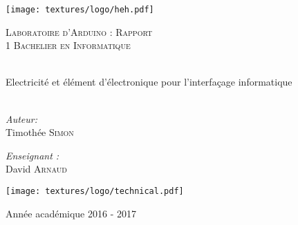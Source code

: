 \begin{center}
  \texttt{[image: textures/logo/heh.pdf]}

  \vspace{1cm}

  \textsc{\LARGE Laboratoire d'Arduino : Rapport} \\ [1cm]

  \textsc{\large 1 Bachelier en Informatique} \\ [0.2cm]

  \begingroup
   \selectfont

  \HRule \\ [0.4cm] {
    \huge Electricité et élément d'électronique pour l'interfaçage informatique \\ [0.2cm]
  }
  \HRule \\ [1.3cm]
  \endgroup

  \begin{minipage}[t]{0.4 \textwidth}
    \begin{flushleft}
      \large \emph{Auteur:} \\
	  Timothée \textsc{Simon}
    \end{flushleft}
  \end{minipage}
  \begin{minipage}[t]{0.4 \textwidth}
    \begin{flushright}
      \large \emph{Enseignant :} \\
	  David \textsc{Arnaud}
    \end{flushright}
  \end{minipage}

  \vspace{2.5cm}

  \texttt{[image: textures/logo/technical.pdf]}

  \vspace{0.5cm}

  Année académique 2016 - 2017
\end{center}

\thispagestyle{empty}